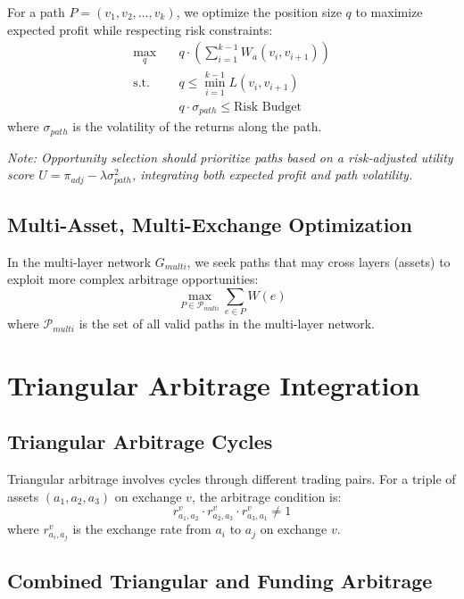 \documentclass{article}
\begin{document}
For a path $P = (v_1, v_2, \ldots, v_k)$, we optimize the position size $q$ to maximize expected profit while respecting risk constraints:
\begin{align}
\max_q \quad & q \cdot \left( \sum_{i=1}^{k-1} W_a(v_i, v_{i+1}) \right) \\
\text{s.t.} \quad & q \leq \min_{i=1}^{k-1} L(v_i, v_{i+1}) \\
& q \cdot \sigma_{path} \leq \text{Risk Budget}
\end{align}
where $\sigma_{path}$ is the volatility of the returns along the path.

\textit{Note: Opportunity selection should prioritize paths based on a risk-adjusted utility score $U = \pi_{adj} - \lambda \sigma_{path}^2$, integrating both expected profit and path volatility.}

\subsection{Multi-Asset, Multi-Exchange Optimization}

In the multi-layer network $G_{multi}$, we seek paths that may cross layers (assets) to exploit more complex arbitrage opportunities:
\begin{equation}
\max_{P \in \mathcal{P}_{multi}} \sum_{e \in P} W(e)
\end{equation}
where $\mathcal{P}_{multi}$ is the set of all valid paths in the multi-layer network.

\section{Triangular Arbitrage Integration}

\subsection{Triangular Arbitrage Cycles}

Triangular arbitrage involves cycles through different trading pairs. For a triple of assets $(a_1, a_2, a_3)$ on exchange $v$, the arbitrage condition is:
\begin{equation}
r_{a_1,a_2}^v \cdot r_{a_2,a_3}^v \cdot r_{a_3,a_1}^v \neq 1
\end{equation}
where $r_{a_i,a_j}^v$ is the exchange rate from $a_i$ to $a_j$ on exchange $v$.

\subsection{Combined Triangular and Funding Arbitrage}
\end{document}
